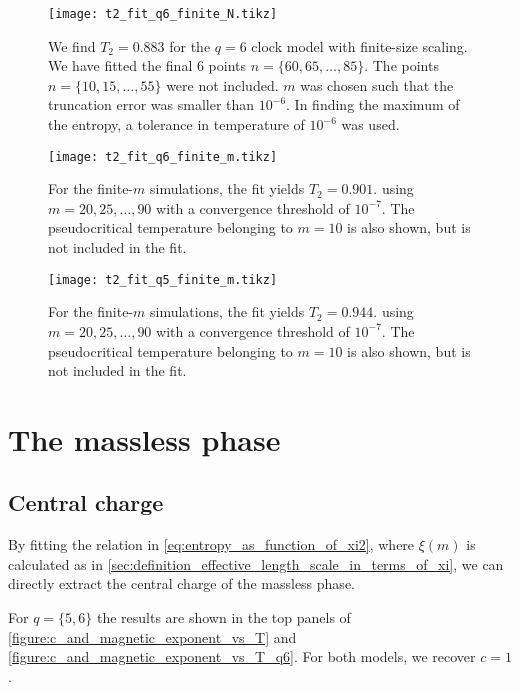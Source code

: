 \begin{figure}
  \centering
  \texttt{[image: t2\_fit\_q6\_finite\_N.tikz]}
  \caption{We find $T_2 = 0.883$ for the $q = 6$ clock model with finite-size scaling.
  We have fitted the final 6 points $n = \{ 60, 65, \dots, 85 \}$.
  The points $n = \{ 10, 15, \dots, 55 \}$ were not included.
  $m$ was chosen such that the truncation error was smaller than $10^{-6}$.
  In finding the maximum of the entropy, a tolerance in temperature of $10^{-6}$ was used.}
  \label{figure:t2_fit_q6_finite_N}
\end{figure}

\begin{figure}
  \centering
  \texttt{[image: t2\_fit\_q6\_finite\_m.tikz]}
  \caption{
  For the finite-$m$ simulations, the fit yields $T_2 = 0.901$.
  using $m = 20, 25, \dots,
  90$ with a convergence threshold of $10^{-7}$.
  The pseudocritical temperature belonging to $m = 10$ is also shown,
  but is not included in the fit.}\label{figure:t2_fit_q6_finite_m}
\end{figure}

\begin{figure}
  \centering
  \texttt{[image: t2\_fit\_q5\_finite\_m.tikz]}
  \caption{
  For the finite-$m$ simulations, the fit yields $T_2 = 0.944$.
  using $m = 20, 25, \dots,
  90$ with a convergence threshold of $10^{-7}$.
  The pseudocritical temperature belonging to $m = 10$ is also shown,
  but is not included in the fit.}\label{figure:t2_fit_q5_finite_m}
\end{figure}

\section{The massless phase}

\subsection{Central charge}\label{sec:central_charge_massless_phase}

By fitting the relation in \autoref{eq:entropy_as_function_of_xi2},
where $\xi(m)$ is calculated as in \autoref{sec:definition_effective_length_scale_in_terms_of_xi},
we can directly extract the central charge of the massless phase.

For $q = \{5, 6\}$ the results are shown in the top panels of \autoref{figure:c_and_magnetic_exponent_vs_T} and
\autoref{figure:c_and_magnetic_exponent_vs_T_q6}.
For both models, we recover $c = 1$.

